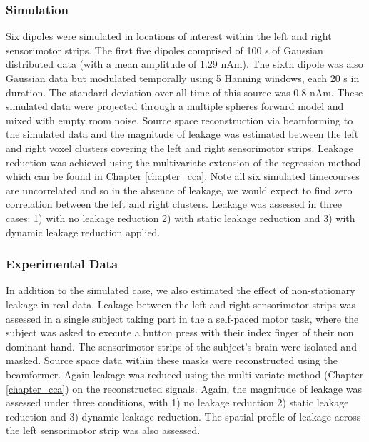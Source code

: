 \subsubsection*{Simulation}
Six dipoles were simulated in locations of interest within the left and right sensorimotor strips. The first five dipoles comprised of 100 s of Gaussian distributed data (with a mean amplitude of 1.29 nAm). The sixth dipole was also Gaussian data but modulated temporally using 5 Hanning windows, each 20 s in duration. The standard deviation over all time of this source was 0.8 nAm. These simulated data were projected through a multiple spheres forward model and mixed with empty room noise. Source space reconstruction via beamforming to the simulated data and the magnitude of leakage was estimated between the left and right voxel clusters covering the left and right sensorimotor strips. Leakage reduction was achieved using the multivariate extension of the regression method which can be found in Chapter \ref{chapter_cca}. Note all six simulated timecourses are uncorrelated and so in the absence of leakage, we would expect to find zero correlation between the left and right clusters. Leakage was assessed in three cases: 1) with no leakage reduction 2) with static leakage reduction and 3) with dynamic leakage reduction applied.

\subsubsection*{Experimental Data}
In addition to the simulated case, we also estimated the effect of non-stationary leakage in real data. Leakage between the left and right sensorimotor strips was assessed in a single subject taking part in the a self-paced motor task, where the subject was asked to execute a button press with their index finger of their non dominant hand. The sensorimotor strips of the subject’s brain were isolated and masked. Source space data within these masks were reconstructed using the beamformer. Again leakage was reduced using the multi-variate method (Chapter \ref{chapter_cca}) on the reconstructed signals. Again, the magnitude of leakage was assessed under three conditions, with 1) no leakage reduction 2) static leakage reduction and 3) dynamic leakage reduction. The spatial profile of leakage across the left sensorimotor strip was also assessed.

